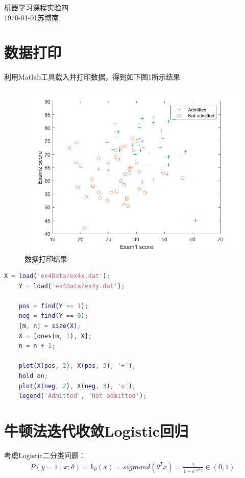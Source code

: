 \documentclass{article}
\begin{document}
\begin{center}
    \huge{机器学习课程实验四}\\
    \large{\today \quad 苏博南}
\end{center}

\section{数据打印}
利用Matlab工具载入并打印数据，得到如下图1所示结果

\begin{figure}[h]
    \centering
    \includegraphics[width=0.7\linewidth]{1.png}
    \caption{数据打印结果}
\end{figure}

\begin{lstlisting}[language=matlab]
    X = load('ex4Data/ex4x.dat');
    Y = load('ex4Data/ex4y.dat');
    
    pos = find(Y == 1);
    neg = find(Y == 0);
    [m, n] = size(X);
    X = [ones(m, 1), X];
    n = n + 1;
    
    plot(X(pos, 2), X(pos, 3), '+');
    hold on;
    plot(X(neg, 2), X(neg, 3), 'o');
    legend('Admitted', 'Not admitted');
\end{lstlisting}

\section{牛顿法迭代收敛Logistic回归}
考虑Logistic二分类问题：
\begin{equation}
    \begin{split}
        P(y=1\;|\;x;\theta)=h_\theta(x)=sigmond(\theta^Tx)=\frac{1}{1+e^{-\theta^Tx}}\in(0, 1)
    \end{split}
\end{equation}
\end{document}
